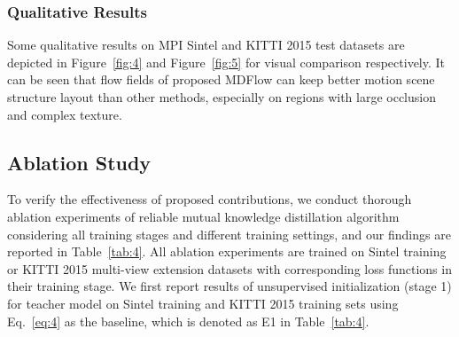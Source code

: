 \documentclass[lettersize,journal]{IEEEtran}
\begin{document}
\subsubsection{Qualitative Results}
Some qualitative results on MPI Sintel and KITTI 2015 test datasets are depicted in Figure~\ref{fig:4} and Figure~\ref{fig:5} for visual comparison respectively. It can be seen that flow fields of proposed MDFlow can keep better motion scene structure layout than other methods, especially on regions with large occlusion and complex texture.

\subsection{Ablation Study}
To verify the effectiveness of proposed contributions, we conduct thorough ablation experiments of reliable mutual knowledge distillation algorithm considering all training stages and different training settings, and our findings are reported in Table~\ref{tab:4}. All ablation experiments are trained on Sintel training or KITTI 2015 multi-view extension datasets with corresponding loss functions in their training stage. We first report results of unsupervised initialization (stage 1) for teacher model on Sintel training and KITTI 2015 training sets using Eq.~\ref{eq:4} as the baseline, which is denoted as E1 in Table~\ref{tab:4}.
\end{document}
